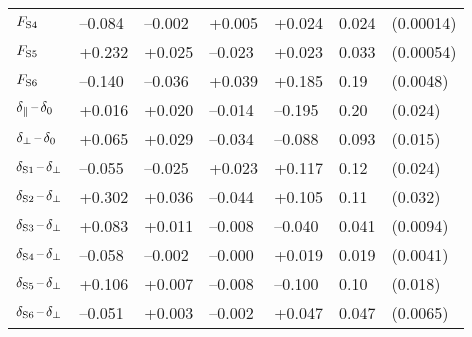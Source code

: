\begin{table}[htbp]
\begin{tabular}{lllllll}
    $\FS[4]$        &  --0.084    &  --0.002  &   +0.005  &   +0.024  &  0.024  &  (0.00014)                    \\
    $\FS[5]$        &   +0.232    &   +0.025  &  --0.023  &   +0.023  &  0.033  &  (0.00054)                    \\
    $\FS[6]$        &  --0.140    &  --0.036  &   +0.039  &   +0.185  &  0.19   &  (0.0048)                     \\
    \hline
    $\delparzero$   &   +0.016    &   +0.020  &  --0.014  &  --0.195  &  0.20   &  (0.024)                      \\
    $\delperpzero$  &   +0.065    &   +0.029  &  --0.034  &  --0.088  &  0.093  &  (0.015)                      \\
    $\delSperp[1]$  &  --0.055    &  --0.025  &   +0.023  &   +0.117  &  0.12   &  (0.024)                      \\
    $\delSperp[2]$  &   +0.302    &   +0.036  &  --0.044  &   +0.105  &  0.11   &  (0.032)                      \\
    $\delSperp[3]$  &   +0.083    &   +0.011  &  --0.008  &  --0.040  &  0.041  &  (0.0094)                     \\
    $\delSperp[4]$  &  --0.058    &  --0.002  &  --0.000  &   +0.019  &  0.019  &  (0.0041)                     \\
    $\delSperp[5]$  &   +0.106    &   +0.007  &  --0.008  &  --0.100  &  0.10   &  (0.018)                      \\
    $\delSperp[6]$  &  --0.051    &   +0.003  &  --0.002  &   +0.047  &  0.047  &  (0.0065)                     \\
    \hline
  \end{tabular}
\end{table}

